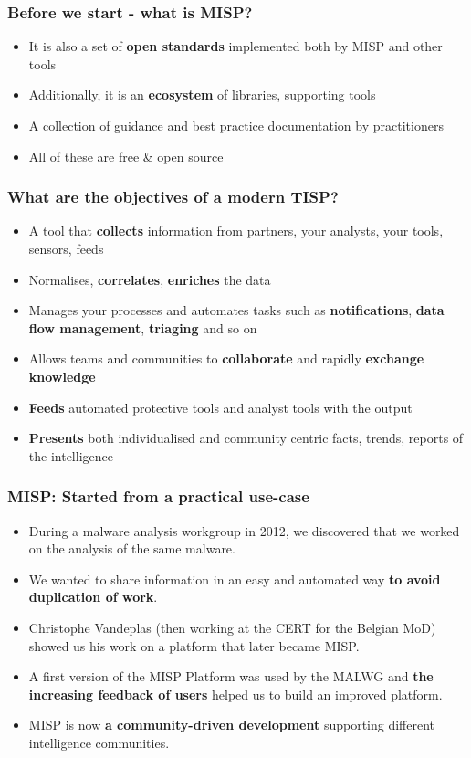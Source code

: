 \begin{frame}
\frametitle{Before we start - what is MISP?}
\begin{itemize}
        \item It is also a set of {\bf open standards} implemented both by MISP and other tools
        \item Additionally, it is an {\bf ecosystem} of libraries, supporting tools
        \item A collection of guidance and best practice documentation by practitioners
        \item All of these are free \& open source
\end{itemize}
\end{frame}

\begin{frame}
\frametitle{What are the objectives of a modern TISP?}      
\begin{itemize}
       \item A tool that {\bf collects} information from partners, your analysts, your tools, sensors, feeds
       \item Normalises, {\bf correlates}, {\bf enriches} the data
       \item Manages your processes and automates tasks such as {\bf notifications}, {\bf data flow management}, {\bf triaging} and so on
       \item Allows teams and communities to {\bf collaborate} and rapidly {\bf exchange knowledge}
       \item {\bf Feeds} automated protective tools and analyst tools with the output
       \item {\bf Presents} both individualised and community centric facts, trends, reports of the intelligence
\end{itemize}
\end{frame}


\begin{frame}
 \frametitle{MISP: Started from a practical use-case}
 \begin{itemize}
         \item During a malware analysis workgroup in 2012, we discovered that we worked on the analysis of the same malware.
         \item We wanted to share information in an easy and automated way {\bf to avoid duplication of work}.
         \item Christophe Vandeplas (then working at the CERT for the Belgian MoD) showed us his work on a platform that later became MISP.
         \item A first version of the MISP Platform was used by the MALWG and {\bf the increasing feedback of users} helped us to build an improved platform.
         \item MISP is now {\bf a community-driven development} supporting different intelligence communities.
 \end{itemize}
\end{frame}


